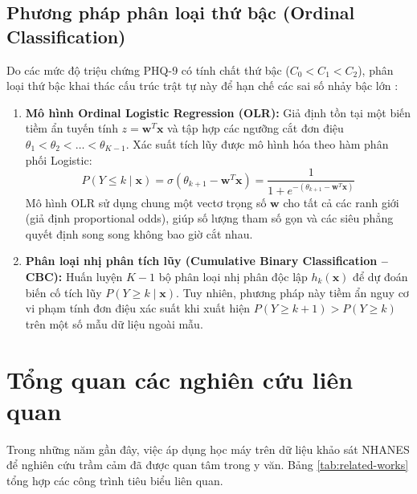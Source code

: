 \subsection{Phương pháp phân loại thứ bậc (Ordinal Classification)}
\label{subsec:ordinal-paradigm}

Do các mức độ triệu chứng PHQ-9 có tính chất thứ bậc ($C_0 < C_1 < C_2$), phân loại thứ bậc khai thác cấu trúc trật tự này để hạn chế các sai số nhảy bậc lớn \cite{mccullagh1980regression, frank2001simple}:
\begin{enumerate}
    \item \textbf{Mô hình Ordinal Logistic Regression (OLR):} Giả định tồn tại một biến tiềm ẩn tuyến tính $z = \mathbf{w}^T \mathbf{x}$ và tập hợp các ngưỡng cắt đơn điệu $\theta_1 < \theta_2 < \dots < \theta_{K-1}$. Xác suất tích lũy được mô hình hóa theo hàm phân phối Logistic:
    \begin{equation}
        P(Y \le k \mid \mathbf{x}) = \sigma(\theta_{k+1} - \mathbf{w}^T \mathbf{x}) = \frac{1}{1 + e^{-(\theta_{k+1} - \mathbf{w}^T \mathbf{x})}}
    \end{equation}
    Mô hình OLR sử dụng chung một vectơ trọng số $\mathbf{w}$ cho tất cả các ranh giới (giả định proportional odds), giúp số lượng tham số gọn và các siêu phẳng quyết định song song không bao giờ cắt nhau.
    \item \textbf{Phân loại nhị phân tích lũy (Cumulative Binary Classification -- CBC):} Huấn luyện $K-1$ bộ phân loại nhị phân độc lập $h_k(\mathbf{x})$ để dự đoán biến cố tích lũy $P(Y \ge k \mid \mathbf{x})$. Tuy nhiên, phương pháp này tiềm ẩn nguy cơ vi phạm tính đơn điệu xác suất khi xuất hiện $P(Y \ge k+1) > P(Y \ge k)$ trên một số mẫu dữ liệu ngoài mẫu.
\end{enumerate}

\section{Tổng quan các nghiên cứu liên quan}
\label{sec:nghien-cuu-lien-quan}

Trong những năm gần đây, việc áp dụng học máy trên dữ liệu khảo sát NHANES để nghiên cứu trầm cảm đã được quan tâm trong y văn. Bảng \ref{tab:related-works} tổng hợp các công trình tiêu biểu liên quan.

